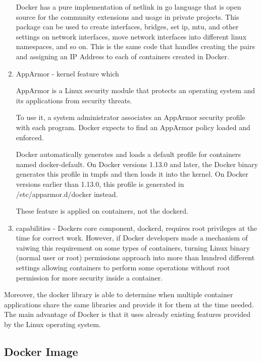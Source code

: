 \begin{enumerate}
Docker has a pure implementation of netlink
in go language that is open source for the community extensions
and usage in private projects.
This package can be used to create interfaces,
bridges, set ip, mtu, and other settings on network interfaces,
move network interfaces into different linux namespaces,
and so on.
This is the same code that handles creating the pairs and assigning
an IP Address to each of containers created in Docker.

\item AppArmor - kernel feature which
\begin{definition}
AppArmor is a Linux security module
that protects an operating system and its applications from security threats.
\end{definition}

To use it, a system administrator associates an
AppArmor security profile with each program.
Docker expects to find an AppArmor policy loaded and enforced.

Docker automatically generates and loads a default profile for containers
named docker-default. On Docker versions 1.13.0 and later, the Docker
binary generates this profile in tmpfs and then loads it into the kernel.
On Docker versions earlier than 1.13.0, this
profile is generated in /etc/apparmor.d/docker instead.

These feature is applied on containers, not the dockerd.

\item capabilities - Dockers core component, dockerd,
requires root privileges at the time for correct work.
However, if Docker developers made a mechanism of vaiwing this requirement on
some types of containers, turning Linux binary (normal user or root) permissions
approach into more than hundred different settings allowing containers
to perform some operations without root permission for more security inside
a container.\cite{AdrMouCapabilities:2016}

\end{enumerate}

Moreover, the docker library is able to determine when multiple container
applications share the same libraries
and provide it for them at the time needed.\cite{AdrMouContainersBinaries:2016}
The main advantage of Docker is that it uses already existing features
provided by the Linux operating system.

\subsection{Docker Image}

